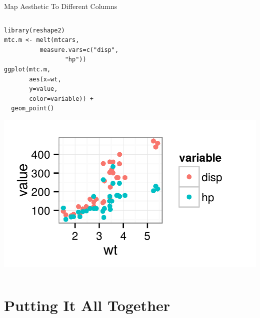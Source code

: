 \documentclass[table,smaller]{beamer}
\begin{document}
\begin{frame}[fragile,label=sec-7-1]{Map Aesthetic To Different Columns}
\begin{columns}
\begin{column}{0.5\textwidth}
\begin{columns}
\begin{block}{}
\begin{verbatim}
library(reshape2)
mtc.m <- melt(mtcars,
	      measure.vars=c("disp", 
			     "hp"))
ggplot(mtc.m,
       aes(x=wt,
	   y=value,
	   color=variable)) +
  geom_point()
\end{verbatim}

\includegraphics[width=.9\linewidth]{images/meltingDataExe.png}

\end{block} \end{columns}
\end{column}
\end{columns}
\end{frame}

\section{Putting It All Together}
\label{sec-8}
\end{document}
